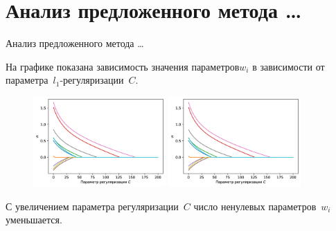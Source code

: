 \documentclass[10pt,pdf,hyperref={unicode}]{beamer}
\begin{document}
\section{Анализ предложенного метода \ldots}
\begin{frame}{Анализ предложенного метода \ldots}
\justifying

На графике показана зависимость значения параметров$w_i$ в зависимости от параметра~$l_1$-регуляризации~$C$.
\begin{figure}[h!]
\includegraphics[width=0.45\textwidth]{../figures/log_reg_cs_exp}
\includegraphics[width=0.45\textwidth]{../figures/log_reg_cs_exp}
\end{figure}

С увеличением параметра регуляризации~$C$ число ненулевых параметров~$w_i$ уменьшается.

\end{frame}

\end{document}
